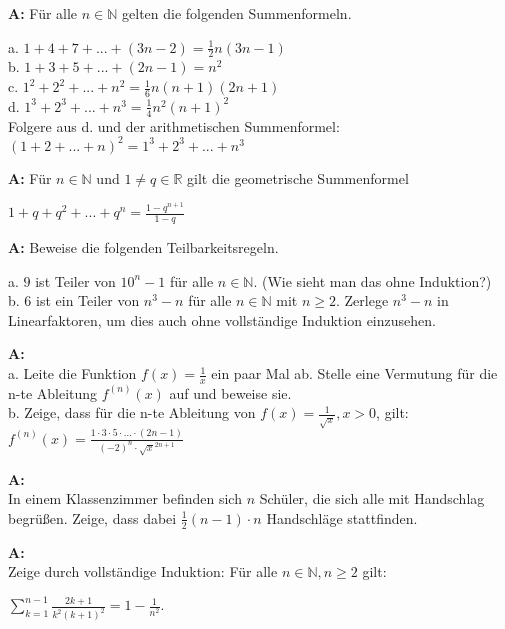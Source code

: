 \documentclass[landscape,twocolumn,a4paper]{article}
\begin{document}
\textbf{A:} Für alle $n \in \mathbb{N}$ gelten die folgenden Summenformeln.

a. $1 + 4 + 7 + ... + (3n - 2) = \frac{1}{2}n(3n - 1)$ \\
b. $1 + 3 + 5 + ... + (2n - 1) = n^2$ \\
c. $1^2 + 2^2 + ... + n^2 = \frac{1}{6}n(n+1)(2n+1)$ \\
d. $1^3 + 2^3 + ... + n^3 = \frac{1}{4}n^2(n+1)^2$ \\

Folgere aus d. und der arithmetischen Summenformel: \\
$(1 + 2  + ... + n)^2 = 1^3 + 2^3 + ... + n^3$
\bigskip {}

\textbf{A:} Für $n \in \mathbb{N}$ und $1 \ne q \in \mathbb{R}$ gilt die geometrische Summenformel

$1 + q + q^2 + ... + q^n = \frac{1- q^{n+1}}{1-q}$
\bigskip {}

\textbf{A:} Beweise die folgenden Teilbarkeitsregeln.

a. $9$ ist Teiler von $10^n-1$ für alle $n \in \mathbb{N}$. (Wie sieht man das ohne Induktion?) \\
b. $6$ ist ein Teiler von $n^3 - n$ für alle $n \in \mathbb{N}$ mit $n \ge 2$. Zerlege $n^3-n$ in Linearfaktoren, 
um dies auch ohne vollständige Induktion einzusehen.
\bigskip {}

\textbf{A:}  \\
a. Leite die Funktion $f(x) = \frac{1}{x}$ ein paar Mal ab. Stelle eine Vermutung
für die n-te Ableitung $f^{(n)}(x)$ auf und beweise sie. \\
b. Zeige, dass für die n-te Ableitung von $f(x) = \frac{1}{\sqrt{x}}, x > 0$, gilt: \\
$f^{(n)}(x) = \frac{1 \cdot 3 \cdot 5 \cdot ... \cdot (2n-1)}{(-2)^n \cdot \sqrt{x}^{2n+1}}$

\bigskip {}

\textbf{A:}  \\
In einem Klassenzimmer befinden sich $n$ Schüler, die sich alle mit Handschlag begrüßen. Zeige,
dass dabei $\frac{1}{2}(n-1)\cdot n$ Handschläge stattfinden.
\bigskip {}

\textbf{A:}  \\
Zeige durch vollständige Induktion: Für alle $n \in \mathbb{N}, n \ge 2$ gilt:

$\sum\limits_{k=1}^{n-1} \frac{2k+1}{k^2(k+1)^2} = 1 - \frac{1}{n^2}.$
\bigskip {}
\end{document}
